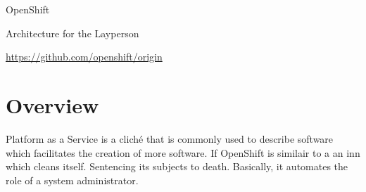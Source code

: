 \documentclass{article}
\begin{document}
\centerline{\sc \large OpenShift}
\centerline{\sc Architecture for the Layperson }
\centerline{\url{https://github.com/openshift/origin}}

\vspace{1pc}

\section{Overview}

\hspace{3pc} Platform as a Service is a clich\'e that is commonly used to describe software which facilitates the 
creation of more software. If OpenShift is similair to a an inn which cleans itself. Sentencing its subjects to death.
Basically, it automates the role of a system administrator. 


\begin{figure}
\end{figure}
\end{document}
